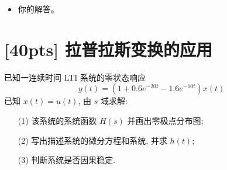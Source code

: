 \documentclass[a4paper,UTF8]{article}
\numberwithin{equation}{section}
\begin{document}
	
	\begin{framed}
		\begin{spacing}{1.5}
			\begin{itemize}
				\item 你的解答。
			\end{itemize}
		\end{spacing}
	\end{framed}
	
	
	
	
	\newpage
	\section{[40pts] 拉普拉斯变换的应用}
	已知一连续时间 LTI 系统的零状态响应
	$$
	y(t)=\left(1+0.6e^{-20t}-1.6e^{-10t}\right) x(t)
	$$
	已知 $x(t)=u(t)$, 由 $s$ 域求解:
	\begin{itemize}
		\item[(1)]该系统的系统函数 $H(s)$ 并画出零极点分布图;
		\item[(2)]写出描述系统的微分方程和系统, 并求 $h(t)$;
		\item[(3)]判断系统是否因果稳定.
	\end{itemize}
	
	
\end{document}
